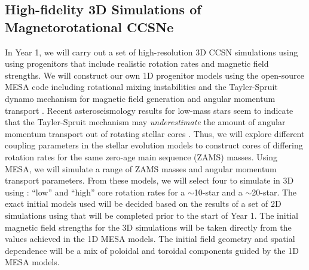 \vspace{0.1in}  

\subsection{High-fidelity 3D Simulations of Magnetorotational CCSNe}
\label{sec:Y1mrccsn}


In Year 1, we will carry out a set of high-resolution 3D CCSN simulations using \sparkmone using progenitors that include realistic rotation rates and magnetic field strengths.
We will construct our own 1D progenitor models using the open-source MESA code \citep{Paxton:2011, Paxton:2013, Paxton:2015} including rotational mixing instabilities and the Tayler-Spruit dynamo mechanism for magnetic field generation and angular momentum transport \citep{Spruit:2002, Heger:2005}.
Recent asteroseismology results for low-mass stars seem to indicate that the Tayler-Spruit mechanism may {\it underestimate} the amount of angular momentum transport out of rotating stellar cores \citep{Cantiello:2014}.
Thus, we will explore different coupling parameters in the stellar evolution models to construct cores of differing rotation rates for the same zero-age main sequence (ZAMS) masses.
Using MESA, we will simulate a range of ZAMS masses and angular momentum transport parameters.
From these models, we will select four to simulate in 3D using \sparkmone: ``low'' and ``high'' core rotation rates for a $\sim$10-\msun star and a $\sim$20-\msun star.
The exact initial models used will be decided based on the results of a set of 2D simulations using \sparkmone that will be completed prior to the start of Year 1.
The initial magnetic field strengths for the 3D simulations will be taken directly from the values achieved in the 1D MESA models.
The initial field geometry and spatial dependence will be a mix of poloidal and toroidal components guided by the 1D MESA models.

